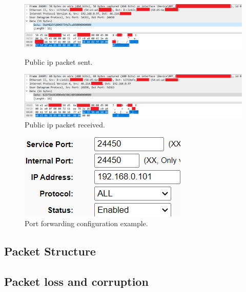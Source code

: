 \documentclass[12pt]{article}
\begin{document}
\begin{figure}[!htb]
	\begin{minipage}{0.48\textwidth}
		\centering
		\includegraphics[width=.7\linewidth]{PublicFinishSend.png}
		\caption{Public ip packet sent.}\label{fig:fig6}
	\end{minipage}\hfill
	\begin{minipage}{0.48\textwidth}
		\centering
		\includegraphics[width=.7\linewidth]{PublicFinishReceive.png}
		\caption{Public ip packet received.}\label{fig:fig7}
	\end{minipage}\hfill
\end{figure}

\begin{figure}[!htb]
	\centering
	\includegraphics[width=\linewidth]{PortForward.png}
	\caption{Port forwarding configuration example.}\label{fig:fig8}
\end{figure}

\subsection{Packet Structure}


\subsection{Packet loss and corruption}
\end{document}
